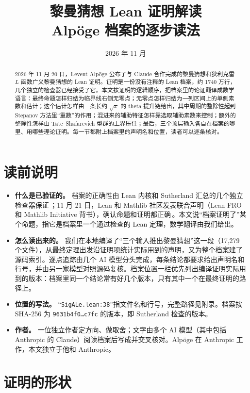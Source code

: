 \documentclass[11pt]{article}
\title{\textsf{黎曼猜想 Lean 证明解读}\\[4pt]\large Alpöge 档案的逐步读法}
\date{2026 年 11 月}
\author{}
\newcommand{\Lean}[1]{\texttt{\small #1}}
\begin{document}
\maketitle

\begin{abstract}
2026 年 11 月 20 日，Levent Alpöge 公布了与 Claude 合作完成的黎曼猜想和狄利克雷 $L$ 函数广义黎曼猜想的 Lean 证明。证明是一份没有注释的 Lean 档案，约 1740 万行，几个独立的检查器已经接受了它。本文按证明的逻辑顺序，把档案里的论证翻译成数学语言：最终命题怎样归结为临界线右侧无零点；无零点怎样归结为一列区间上的单侧素数和估计；这个估计怎样由一条长约 $\sqrt x$ 的 theta 提升链给出，其中周期的整除性起到 Stepanov 方法里“重数”的作用；混进来的辅助特征怎样靠选取辅助素数来控制；额外的整除性怎样由 Tate–Shafarevich 型群的上界压住；最后，三个顶层输入各自在档案的哪里、用哪些理论证明。每一节都附上档案里的声明名和位置，读者可以逐条核对。
\end{abstract}

\section*{读前说明}
\begin{itemize}
\item \textbf{什么是已验证的。} 档案的正确性由 Lean 内核和 Sutherland 汇总的几个独立检查器保证\,\cite{sutherland}；11 月 21 日，Lean 和 Mathlib 社区发表联合声明（Lean FRO 和 Mathlib Initiative 背书），确认命题和证明都正确\,\cite{leanfro}。本文说“档案证明了”某个命题，指它是档案里一个通过检查的 Lean 定理，数学翻译由我们给出。
\item \textbf{怎么读出来的。} 我们在本地编译了“三个输入推出黎曼猜想”这一段（17{,}279 个文件），从最终定理出发沿证明项统计实际用到的声明，又为整个档案建了源码索引。逐点追踪由几个 AI 模型分头完成，每条结论都要求给出声明名和行号，并由另一家模型对照源码复核。档案位置一栏优先列出编译证明实际用到的版本：档案里同一个结论常有好几个版本，只有其中一个在最终证明的路径上。
\item \textbf{位置的写法。} “\Lean{SigALe.lean:38}”指文件名和行号，完整路径见附录。档案按 SHA-256 为 \Lean{9631b4f0\ldots c7fc} 的版本，即 Sutherland 检查的版本。
\item \textbf{作者。} 一位独立作者定方向、做取舍；文字由多个 AI 模型（其中包括 Anthropic 的 Claude）阅读档案后写成并交叉核对。Alpöge 在 Anthropic 工作，本文独立于他和 Anthropic。
\end{itemize}

\section*{证明的形状}\label{sec:shape}
\end{document}
